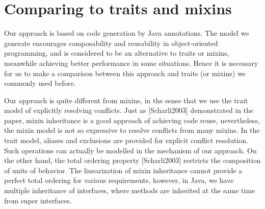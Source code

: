 \section{Comparing to traits and mixins}

\begin{comment}
Haoyuan

   - vs both: we do automatic return type refinement, which has useful applications
   (example: Expression Problem)

   - vs traits: we support of methods to create new objects (a replacement to constructors);
   Moreover we have the with and clone methods (we miss more applications for those). Show
   how to model the operations on traits; discuss operations that we cannot model
   (example: renaming).

   - vs mixins: we use the trait model of explicitly resolving conflicts. This is arguably
   better for reasoning.
\end{comment}

Our approach is based on code generation by Java annotations. The model we generate encourages composability and reusability in object-oriented programming, and is considered to be an alternative to traits or mixins,  meanwhile achieving better performance in some situations. Hence it is necessary for us to make a comparison between this approach and traits (or mixins) we commonly used before.

Our approach is quite different from mixins, in the sense that we use the trait model of explicitly resolving conflicts. Just as [Scharli2003] demonstrated in the paper, mixin inheritance is a good approach of achieving code reuse, nevertheless, the mixin model is not so expressive to resolve conflicts from many mixins. In the trait model, aliases and exclusions are provided for explicit conflict resolution. Such operations can actually be modelled in the mechanism of our approach. On the other hand, the total ordering property [Scharli2003] restricts the composition of units of behavior. The linearization of mixin inheritance cannot provide a perfect total ordering for various requirements, however, in Java, we have multiple inheritance of interfaces, where methods are inherited at the same time from super interfaces.

